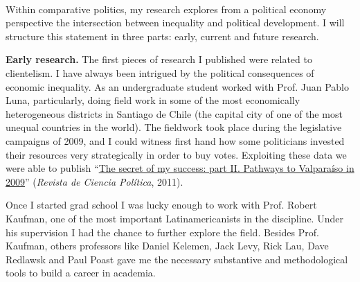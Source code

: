 \documentclass[10pt,stdletter,dateno,sigleft]{newlfm} %
\begin{document}
\begin{newlfm}




\vspace{-2cm}{\bf \huge Research Statement}\\

Within comparative politics, my research explores from a political economy perspective the intersection between inequality and political development. I will structure this statement in three parts: early, current and future research.

{\bf Early research.} The first pieces of research I published were related to clientelism. I have always been intrigued by the political consequences of economic inequality. As an undergraduate student worked with Prof. Juan Pablo Luna, particularly, doing field work in some of the most economically heterogeneous districts in Santiago de Chile (the capital city of one of the most unequal countries in the world). The fieldwork took place during the legislative campaigns of 2009, and I could witness first hand how some politicians invested their resources very strategically in order to buy votes. Exploiting these data we were able to publish ``\href{https://scielo.conicyt.cl/pdf/revcipol/v31n2/art07.pdf}{The secret of my success: part II. Pathways to Valpara\'iso in 2009}'' (\emph{Revista de Ciencia Pol\'itica}, 2011). 

Once I started grad school I was lucky enough to work with Prof. Robert Kaufman, one of the most important Latinamericanists in the discipline. Under his supervision I had the chance to further explore the field. Besides Prof. Kaufman, others professors like Daniel Kelemen, Jack Levy, Rick Lau, Dave Redlawsk and Paul Poast gave me the necessary substantive and methodological tools to build a career in academia.


\end{newlfm}
\end{document}
